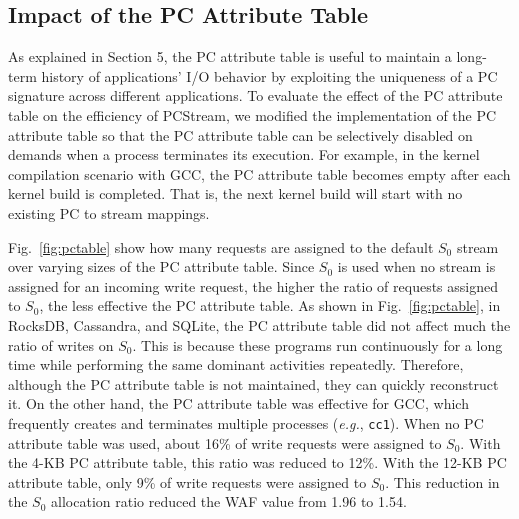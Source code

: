 \vspace{-10pt}
\subsection{Impact of the PC Attribute Table}
\vspace{-5pt}
As explained in Section 5, the PC attribute table is useful to maintain a
long-term history of applications' I/O behavior by exploiting the uniqueness of
a PC signature across different applications.   To evaluate the effect of the
PC attribute table on the efficiency of \textsf{\small PCStream}, we modified
the implementation of the PC attribute table so that the PC attribute table can
be selectively disabled on demands when a process terminates its execution.
For example, in the kernel compilation scenario with GCC, the PC attribute
table becomes empty after each kernel build is completed.  That is, the next
kernel build will start with no existing PC to stream mappings.


Fig.~\ref{fig:pctable} show how many requests are assigned to the default
$S_{0}$ stream over varying sizes of the PC attribute table.  Since $S_{0}$ is
used when no stream is assigned for an incoming write request, the higher the
ratio of requests assigned to $S_{0}$, the less effective the PC attribute
table.   As shown in Fig.~\ref{fig:pctable}, in RocksDB, Cassandra, and SQLite,
the PC attribute table did not affect much the ratio of writes on $S_{0}$.
This is because these programs run continuously for a long time while
performing the same dominant activities repeatedly.  Therefore, although the PC
attribute table is not maintained, they can quickly reconstruct it.  On the
other hand, the PC attribute table was effective for GCC, which frequently
creates and terminates multiple processes ({\it e.g.}, {\tt cc1}).  When no PC
attribute table was used, about 16\% of write requests were assigned to
$S_{0}$.  With the 4-KB PC attribute table, this ratio was reduced to 12\%.
With the 12-KB PC attribute table, only 9\% of write requests were assigned to
$S_{0}$.  This reduction in the $S_{0}$ allocation ratio reduced the WAF value
from 1.96 to 1.54.


